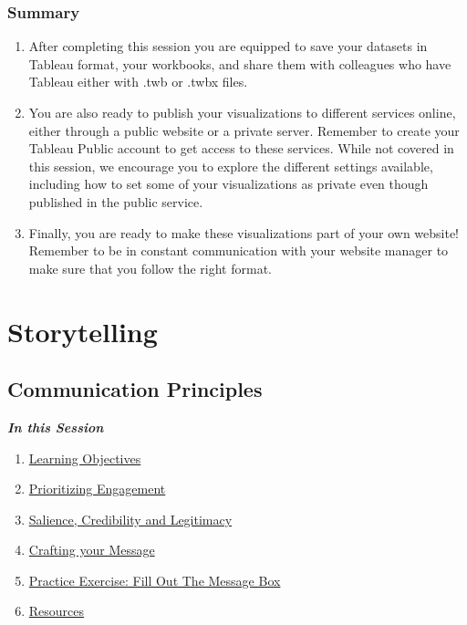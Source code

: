 \documentclass[
]{book}
\providecommand{\tightlist}{%
  \setlength{\itemsep}{0pt}\setlength{\parskip}{0pt}}
\begin{document}
\hypertarget{summary-3}{%
\subsection{Summary}\label{summary-3}}

\begin{enumerate}
\def\labelenumi{\arabic{enumi}.}
\tightlist
\item
  After completing this session you are equipped to save your datasets in Tableau format, your workbooks, and share them with colleagues who have Tableau either with .twb or .twbx files.
\item
  You are also ready to publish your visualizations to different services online, either through a public website or a private server. Remember to create your Tableau Public account to get access to these services. While not covered in this session, we encourage you to explore the different settings available, including how to set some of your visualizations as private even though published in the public service.
\item
  Finally, you are ready to make these visualizations part of your own website! Remember to be in constant communication with your website manager to make sure that you follow the right format.
\end{enumerate}

\hypertarget{storytelling}{%
\chapter{Storytelling}\label{storytelling}}

\hypertarget{communication-principles}{%
\section{Communication Principles}\label{communication-principles}}

\textbf{\emph{In this Session}}

\begin{enumerate}
\def\labelenumi{\arabic{enumi}.}
\tightlist
\item
  \protect\hyperlink{communication-learning-objectives}{Learning Objectives}
\item
  \protect\hyperlink{prioritizing-engagement}{Prioritizing Engagement}
\item
  \protect\hyperlink{salience-credibility-and-legitimacy-cornerstones-of-effective-communication}{Salience, Credibility and Legitimacy}
\item
  \protect\hyperlink{crafting-your-message}{Crafting your Message}
\item
  \protect\hyperlink{the-message-box}{Practice Exercise: Fill Out The Message Box}
\item
  \protect\hyperlink{communication-resources}{Resources}
\end{enumerate}
\end{document}
